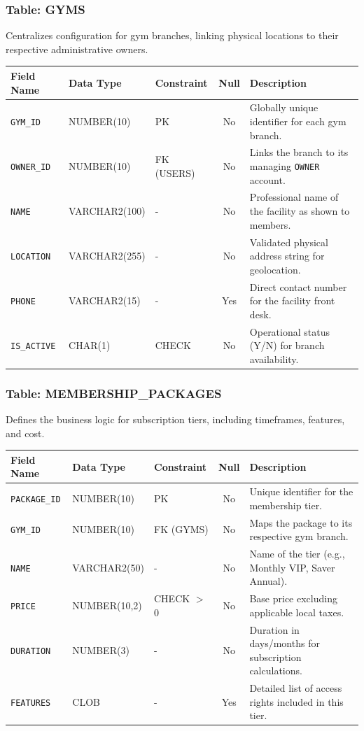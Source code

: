 \documentclass[
  12pt,
  a4paperpaper,
]{report}
\newcounter{none} %
\begin{document}
\subsubsection{Table: GYMS}
Centralizes configuration for gym branches, linking physical locations to their respective administrative owners.

{\def\LTcaptype{none}
\begin{longtable}[]{@{}lllc p{5.5cm}@{}}
\hline
\textbf{Field Name} & \textbf{Data Type} & \textbf{Constraint} & \textbf{Null} & \textbf{Description} \\
\hline
\endhead
\hline
\endlastfoot
\texttt{GYM\_ID} & NUMBER(10) & PK & No & Globally unique identifier for each gym branch. \\
\texttt{OWNER\_ID} & NUMBER(10) & FK (USERS) & No & Links the branch to its managing \texttt{OWNER} account. \\
\texttt{NAME} & VARCHAR2(100) & - & No & Professional name of the facility as shown to members. \\
\texttt{LOCATION} & VARCHAR2(255) & - & No & Validated physical address string for geolocation. \\
\texttt{PHONE} & VARCHAR2(15) & - & Yes & Direct contact number for the facility front desk. \\
\texttt{IS\_ACTIVE} & CHAR(1) & CHECK & No & Operational status (Y/N) for branch availability. \\
\hline
\end{longtable}
}

\subsubsection{Table: MEMBERSHIP\_PACKAGES}
Defines the business logic for subscription tiers, including timeframes, features, and cost.

{\def\LTcaptype{none}
\begin{longtable}[]{@{}lllc p{5.5cm}@{}}
\hline
\textbf{Field Name} & \textbf{Data Type} & \textbf{Constraint} & \textbf{Null} & \textbf{Description} \\
\hline
\endhead
\hline
\endlastfoot
\texttt{PACKAGE\_ID} & NUMBER(10) & PK & No & Unique identifier for the membership tier. \\
\texttt{GYM\_ID} & NUMBER(10) & FK (GYMS) & No & Maps the package to its respective gym branch. \\
\texttt{NAME} & VARCHAR2(50) & - & No & Name of the tier (e.g., Monthly VIP, Saver Annual). \\
\texttt{PRICE} & NUMBER(10,2) & CHECK $>$ 0 & No & Base price excluding applicable local taxes. \\
\texttt{DURATION} & NUMBER(3) & - & No & Duration in days/months for subscription calculations. \\
\texttt{FEATURES} & CLOB & - & Yes & Detailed list of access rights included in this tier. \\
\hline
\end{longtable}
}
\end{document}
